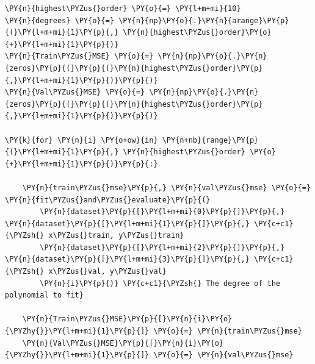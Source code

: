 \documentclass[a4paper,11pt]{article}%
\begin{document}
    \begin{tcolorbox}[breakable, size=fbox, boxrule=1pt, pad at break*=1mm,colback=cellbackground, colframe=cellborder]
\begin{Verbatim}[commandchars=\\\{\}]
\PY{n}{highest\PYZus{}order} \PY{o}{=} \PY{l+m+mi}{10}
\PY{n}{degrees} \PY{o}{=} \PY{n}{np}\PY{o}{.}\PY{n}{arange}\PY{p}{(}\PY{l+m+mi}{1}\PY{p}{,} \PY{n}{highest\PYZus{}order}\PY{o}{+}\PY{l+m+mi}{1}\PY{p}{)}
\PY{n}{Train\PYZus{}MSE} \PY{o}{=} \PY{n}{np}\PY{o}{.}\PY{n}{zeros}\PY{p}{(}\PY{p}{(}\PY{n}{highest\PYZus{}order}\PY{p}{,}\PY{l+m+mi}{1}\PY{p}{)}\PY{p}{)}
\PY{n}{Val\PYZus{}MSE} \PY{o}{=} \PY{n}{np}\PY{o}{.}\PY{n}{zeros}\PY{p}{(}\PY{p}{(}\PY{n}{highest\PYZus{}order}\PY{p}{,}\PY{l+m+mi}{1}\PY{p}{)}\PY{p}{)}

\PY{k}{for} \PY{n}{i} \PY{o+ow}{in} \PY{n+nb}{range}\PY{p}{(}\PY{l+m+mi}{1}\PY{p}{,} \PY{n}{highest\PYZus{}order} \PY{o}{+}\PY{l+m+mi}{1}\PY{p}{)}\PY{p}{:}
    
    \PY{n}{train\PYZus{}mse}\PY{p}{,} \PY{n}{val\PYZus{}mse} \PY{o}{=} \PY{n}{fit\PYZus{}and\PYZus{}evaluate}\PY{p}{(}
        \PY{n}{dataset}\PY{p}{[}\PY{l+m+mi}{0}\PY{p}{]}\PY{p}{,} \PY{n}{dataset}\PY{p}{[}\PY{l+m+mi}{1}\PY{p}{]}\PY{p}{,} \PY{c+c1}{\PYZsh{} x\PYZus{}train, y\PYZus{}train}
        \PY{n}{dataset}\PY{p}{[}\PY{l+m+mi}{2}\PY{p}{]}\PY{p}{,} \PY{n}{dataset}\PY{p}{[}\PY{l+m+mi}{3}\PY{p}{]}\PY{p}{,} \PY{c+c1}{\PYZsh{} x\PYZus{}val, y\PYZus{}val}
        \PY{n}{i}\PY{p}{)} \PY{c+c1}{\PYZsh{} The degree of the polynomial to fit}

    \PY{n}{Train\PYZus{}MSE}\PY{p}{[}\PY{n}{i}\PY{o}{\PYZhy{}}\PY{l+m+mi}{1}\PY{p}{]} \PY{o}{=} \PY{n}{train\PYZus{}mse}
    \PY{n}{Val\PYZus{}MSE}\PY{p}{[}\PY{n}{i}\PY{o}{\PYZhy{}}\PY{l+m+mi}{1}\PY{p}{]} \PY{o}{=} \PY{n}{val\PYZus{}mse}



\end{Verbatim}
\end{tcolorbox}
\end{document}
